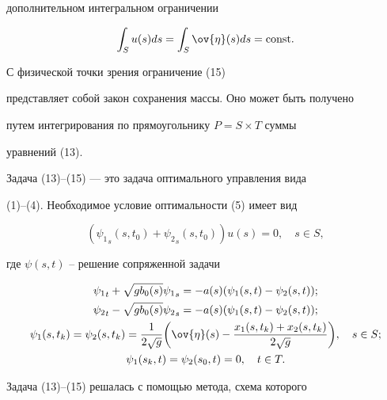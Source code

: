 дополнительном интегральном ограничении


\begin{equation}


\int _S u(s) ds = \int_S \ov{\eta} (s) ds =\mathrm{const}.


\end{equation}


С физической точки зрения ограничение (15)


представляет собой закон сохранения массы. Оно может быть получено


путем интегрирования по прямоугольнику $P=S \times T $ суммы


уравнений (13).





Задача (13)--(15) --- это задача оптимального управления вида


(1)--(4). Необходимое условие оптимальности (5) имеет вид


$$


({\psi_1}_s(s,t_0) + {\psi_2}_s(s,t_0)) u(s) = 0, \quad s \in S,


$$


где $\psi(s,t)$ -- решение сопряженной задачи


\begin{gather*}


{\psi_1}_t + \sqrt{g b_0(s)}{\psi_1}_s = - a(s) 


(\psi_1(s,t) - \psi_2(s,t));\\


%


{\psi_2}_t - \sqrt{g b_0(s)}{\psi_2}_s = - a(s) 


(\psi_1(s,t)-\psi_2(s,t));\\


%


\psi_1(s,t_k) = \psi_2(s,t_k) =  \frac{1}{2\sqrt{g}}


\bigg(\ov{\eta}(s) - \frac{x_1(s,t_k) + x_2 (s,t_k)}


{2 \sqrt{g}} \bigg), \quad s \in S;\\


%


\psi_1(s_k,t)=\psi_2(s_0,t)=0, \quad t\in T.


\end{gather*}





Задача (13)--(15) решалась с помощью метода, схема которого


